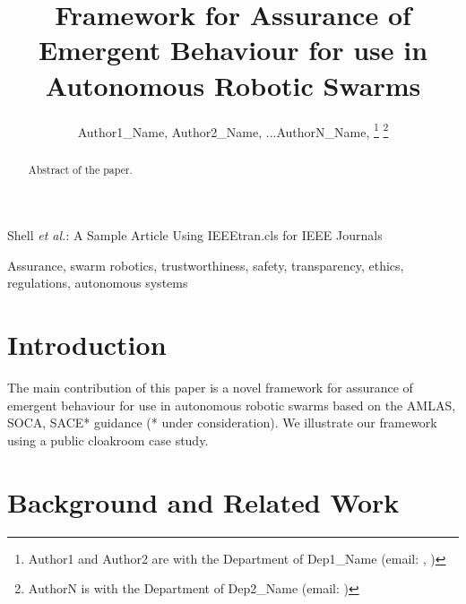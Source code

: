 \documentclass[lettersize,journal]{IEEEtran}
\begin{document}
\title{Framework for Assurance of Emergent Behaviour for use in Autonomous Robotic Swarms}

\author{Author1\_Name, Author2\_Name, ...AuthorN\_Name,
\thanks{Author1 and Author2 are with the Department of Dep1\_Name (email: , )}
\thanks{AuthorN is with the Department of Dep2\_Name (email: )}}
%
{Shell \MakeLowercase{\textit{et al.}}: A Sample Article Using IEEEtran.cls for IEEE Journals}


\maketitle

\begin{abstract}
	Abstract of the paper.
\end{abstract}

\begin{IEEEkeywords}
	Assurance, swarm robotics, trustworthiness, safety, transparency, ethics, regulations, autonomous systems
\end{IEEEkeywords}

\section{Introduction}\label{introduction}
The main contribution of this paper is a novel framework for assurance of emergent behaviour for use in autonomous robotic swarms based on the AMLAS, SOCA, SACE* guidance (* under consideration). We illustrate our framework using a public cloakroom case study. 



\section{Background and Related Work}\label{background-relatedwork}
\end{document}
